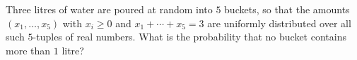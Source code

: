 Three litres of water are poured at random into $5$ buckets, so that the amounts $(x_1,\dots,x_5)$ with $x_i\ge0$ and $x_1+\cdots+x_5=3$ are uniformly distributed over all such $5$-tuples of real numbers. What is the probability that no bucket contains more than $1$ litre?
